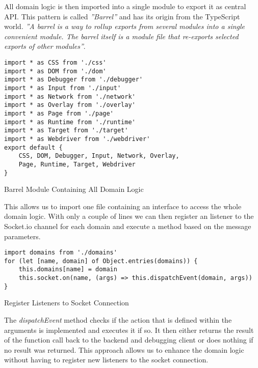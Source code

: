 All domain logic is then imported into a single module to export it as central API. This pattern is called
\textit{''Barrel''} and has its origin from the TypeScript world. \textit{''A barrel is a way to rollup
exports from several modules into a single convenient module. The barrel itself is a module file that
re-exports selected exports of other modules''}\cite{barrel}.

\begin{listing}[H]
\begin{verbatim}
import * as CSS from './css'
import * as DOM from './dom'
import * as Debugger from './debugger'
import * as Input from './input'
import * as Network from './network'
import * as Overlay from './overlay'
import * as Page from './page'
import * as Runtime from './runtime'
import * as Target from './target'
import * as Webdriver from './webdriver'
export default {
    CSS, DOM, Debugger, Input, Network, Overlay,
    Page, Runtime, Target, Webdriver
}
\end{verbatim}
\caption{Barrel Module Containing All Domain Logic}
\label{lst:barrel}
\end{listing}

This allows us to import one file containing an interface to access the whole domain logic. With only a
couple of lines we can then register an listener to the Socket.io channel for each domain and execute
a method based on the message parameters.

\begin{listing}[H]
\begin{verbatim}
import domains from './domains'
for (let [name, domain] of Object.entries(domains)) {
    this.domains[name] = domain
    this.socket.on(name, (args) => this.dispatchEvent(domain, args))
}
\end{verbatim}
\caption{Register Listeners to Socket Connection}
\label{lst:barrel}
\end{listing}

The \textit{dispatchEvent} method checks if the action that is defined within the arguments is implemented
and executes it if so. It then either returns the result of the function call back to the backend and
debugging client or does nothing if no result was returned. This approach allows us to enhance the domain
logic without having to register new listeners to the socket connection.

